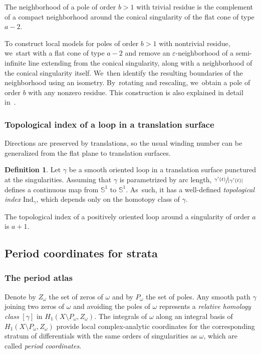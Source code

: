 \documentclass[11pt]{article}
\newcommand{\Subsection}{\subsection}
\let\epsilon\varepsilon
\theoremstyle{definition}
\newtheorem{defn}[thm]{Definition}
\begin{document}
The neighborhood of a pole of order $b>1$ with trivial residue is the complement of a compact neighborhood around the conical singularity of the flat cone of type $a-2$.

To construct local models for poles of order $b>1$ with nontrivial residue, we~start with a flat cone of type $a-2$ and remove an $\epsilon$-neighborhood of a semi-infinite line extending from the conical singularity, along with a neighborhood of the conical singularity itself. We~then identify the resulting boundaries of the neighborhood using an isometry. By~rotating and rescaling, we~obtain a pole of order $b$ with any nonzero residue. This construction is also explained in detail in~\cite{Bo}.

\subsubsection{Topological index of a loop in a translation surface}\label{sub:rotation}

Directions are preserved by translations, so the usual winding number can be generalized from the flat plane to translation surfaces.
\begin{defn}
Let $\gamma$ be a smooth oriented loop in a translation surface punctured at the singularities. Assuming that $\gamma$ is parametrized by arc length, $\sfrac{\gamma'(t)}{|\gamma'(t)|}$ defines a continuous map from $\mathbb{S}^{1}$ to $\mathbb{S}^{1}$. As~such, it has a well-defined \textit{topological index} $\mathrm{Ind}_{\gamma}$, which depends only on the homotopy class of $\gamma$.
\end{defn}

The topological index of a positively oriented loop around a singularity of order $a$ is $a+1$.

\Subsection{Period coordinates for strata}\label{sec:periodcoor}

\subsubsection{The period atlas}

Denote by $Z_{\omega}$ the set of zeros of $\omega$ and by $P_{\omega}$ the set of poles. Any smooth path $\gamma$ joining two zeros of $\omega$ and avoiding the poles of $\omega$ represents a \textit{relative homology class} $[\gamma]$ in $H_{1}(X \setminus P_{\omega},Z_{\omega})$. The integrals of $\omega$ along an integral basis of $H_{1}(X \setminus P_{\omega},Z_{\omega})$ provide local complex-analytic coordinates for the corresponding stratum of differentials with the same orders of singularities as $\omega$, which are called {\em period coordinates}.
\end{document}
